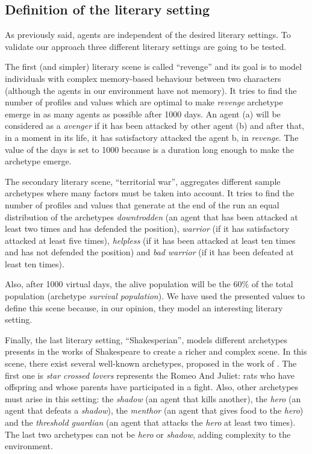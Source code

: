 \documentclass[letterpaper]{article}
\begin{document}
\subsection{Definition of the literary setting}

As previously said, agents are independent of the desired literary settings. To validate our approach three different literary settings are going to be tested.

The first (and simpler) literary scene is called ``revenge'' and its goal is to model individuals with complex memory-based behaviour between two characters (although the agents in our environment have not memory). It tries to find the number of profiles and values which are optimal to make \textit{revenge} archetype emerge in as many agents as possible after 1000 days.  An agent (a) will be considered as a \textit{avenger} if it has been attacked by other agent (b) and after that, in a moment in its life, it has satisfactory attacked the agent b, in \textit{revenge}. The value of the days is set to 1000 because is a duration long enough to make the archetype emerge. 

The secondary literary scene, ``territorial war'', aggregates different sample archetypes where many factors must be taken into account.  It tries to find the number of profiles and values that generate at the end of the run an equal distribution of the archetypes \textit{downtrodden} (an agent that has been attacked at least two times and has defended the position), \textit{warrior} (if it has satisfactory attacked at least five times), \textit{helpless} (if it has been attacked at least ten times and has not defended the position) and \textit{bad warrior} (if it has been defeated at least ten times).

 Also,  after 1000 virtual days, the alive population will be the 60\% of the total population (archetype \textit{survival population}). We have used the presented values to define this scene because, in our opinion, they model an interesting literary setting. 

Finally, the last literary setting, ``Shakesperian'', models different archetypes presents in the works of Shakespeare to create a richer and complex scene. In this scene, there exist several well-known archetypes, proposed in the work of \cite{vogler1998writer}. The first one is \textit{star crossed lovers} represents the Romeo And Juliet: rats who have offspring and whose parents have participated in a fight. Also, other archetypes must arise in this setting: the \textit{shadow} (an agent that kills another), the \textit{hero} (an agent that defeats a \textit{shadow}), the \textit{menthor} (an agent that gives food to the \textit{hero}) and the \textit{threshold guardian} (an agent that attacks the \textit{hero} at least two times). The last two archetypes can not be \textit{hero} or \textit{shadow}, adding complexity to the environment.
\end{document}
